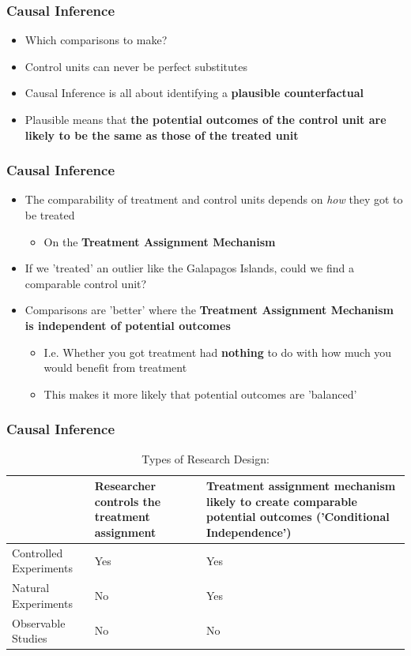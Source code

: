 \documentclass[xcolor=x11names,compress]{beamer}\usepackage[]{graphicx}\usepackage[]{color}
\renewcommand{\(}{\begin{columns}}
\renewcommand{\)}{\end{columns}}
\newcommand{\<}[1]{\begin{column}{#1}}
\renewcommand{\>}{\end{column}}
\begin{document}
\begin{frame}
\frametitle{Causal Inference}
\begin{itemize}
\item Which comparisons to make? 
\pause
\item Control units can never be perfect substitutes
\pause
\item Causal Inference is all about identifying a \textbf{plausible counterfactual}
\pause
\item Plausible means that \textbf{the potential outcomes of the control unit are likely to be the same as those of the treated unit}
\end{itemize}
\end{frame}

\begin{frame}
\frametitle{Causal Inference}
\begin{itemize}
\item The comparability of treatment and control units depends on \textit{how} they got to be treated
\pause
\begin{itemize}
\item On the \textbf{Treatment Assignment Mechanism}
\pause
\end{itemize}
\item If we 'treated' an outlier like the Galapagos Islands, could we find a comparable control unit?
\pause
\item Comparisons are 'better' where the \textbf{Treatment Assignment Mechanism is independent of potential outcomes}
\pause
\begin{itemize}
\item I.e. Whether you got treatment had \textbf{nothing} to do with how much you would benefit from treatment 
\item This makes it more likely that potential outcomes are 'balanced'
\end{itemize}
\end{itemize}
\end{frame}

\begin{frame}
\frametitle{Causal Inference}
\begin{table}[htbp]
  \centering
  \caption{Types of Research Design:}
    \begin{tabular}{|p{3.5cm}|p{3.5cm}|p{3.5cm}|}
    \toprule
          & Researcher controls the treatment assignment & Treatment assignment mechanism likely to create comparable potential outcomes ('Conditional Independence') \\
    \midrule
    Controlled Experiments & Yes   & Yes \\
    \midrule
    Natural Experiments & No    & Yes \\
    \midrule
    Observable Studies & No    & No \\
    \bottomrule
    \end{tabular}%
  \label{tab:addlabel}%
\end{table}%
\end{frame}
\end{document}
